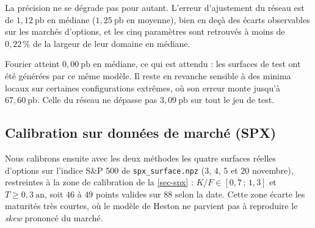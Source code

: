 La précision ne se dégrade pas pour autant. L'erreur d'ajustement du réseau est de $1{,}12~\text{pb}$ en médiane
($1{,}25~\text{pb}$ en moyenne), bien en deçà des écarts observables sur les marchés d'options, et les cinq
paramètres sont retrouvés à moins de $0{,}22\,\%$ de la largeur de leur domaine en médiane.

Fourier atteint $0{,}00~\text{pb}$ en médiane, ce qui est attendu : les surfaces de test ont été générées par ce même
modèle. Il reste en revanche sensible à des minima locaux sur certaines configurations extrêmes, où son erreur
monte jusqu'à $67{,}60~\text{pb}$. Celle du réseau ne dépasse pas $3{,}09~\text{pb}$ sur tout le jeu de test.

\subsection{Calibration sur données de marché (SPX)}

Nous calibrons ensuite avec les deux méthodes les quatre surfaces réelles d'options sur l'indice S\&P 500 de
\texttt{spx\_surface.npz} ($3$, $4$, $5$ et $20$ novembre), restreintes à la zone de calibration de la
\cref{sec-spx} : $K/F \in [0{,}7\,;\,1{,}3]$ et $T \ge 0{,}3~\text{an}$, soit $46$ à $49$ points valides sur $88$
selon la date. Cette zone écarte les maturités très courtes, où le modèle de Heston ne parvient pas à reproduire le
\textit{skew} prononcé du marché.

